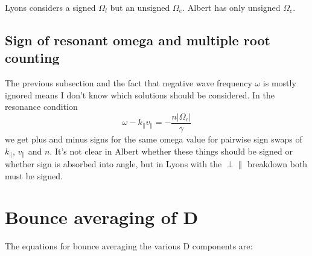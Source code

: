 \documentclass[]{article}
\begin{document}
Lyons considers a signed $\Omega_l$ but an unsigned $\Omega_e$. Albert has only unsigned $\Omega_c$. 

\subsection{Sign of resonant omega and multiple root counting}
The previous subsection and the fact that negative wave frequency $\omega$ is mostly ignored means I don't know which solutions should be considered. In the resonance condition
\[ \omega  - k_\parallel v_\parallel = - \frac{n |\Omega_c|}{\gamma} \] we get plus and minus signs for the same omega value for pairwise sign swaps of $k_\parallel$, $v_\parallel$ and $n$. It's not clear in Albert whether these things should be signed or whether sign is absorbed into angle, but in Lyons with the $\perp \parallel$ breakdown both must be signed. 

\section{Bounce averaging of D}
The equations for bounce averaging the various D components are:
\end{document}

